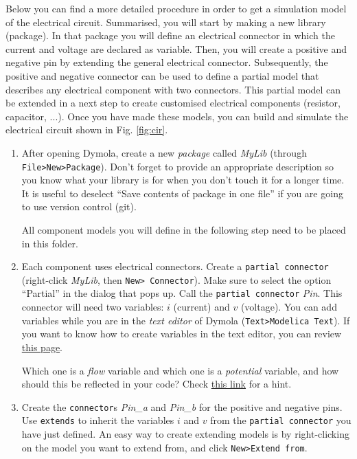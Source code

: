 \documentclass[10pt,a4paper]{article}
\begin{document}
Below you can find a more detailed procedure in order to get a simulation model of the electrical circuit. Summarised, you will start by making a new library (package). In that package you will define an electrical connector in which the current and voltage are declared as variable. Then, you will create a positive and negative pin by extending the general electrical connector. Subsequently, the positive and negative connector can be used to define a partial model that describes any electrical component with two connectors. This partial model can be extended in a next step to create customised electrical components (resistor, capacitor, ...). Once you have made these models, you can build and simulate the electrical circuit shown in Fig. \ref{fig:cir}.
\vspace{5 mm}

\begin{enumerate}
	\item After opening Dymola, create a new \textit{package} called \textit{MyLib} (through \texttt{File>New>Package}). Don't forget to provide an appropriate description so you know what your library is for when you don't touch it for a longer time. It is useful to deselect ``Save contents of package in one file'' if you are going to use version control (git).
	
	All component models you will define in the following step need to be placed in this folder.
	
	\item Each component uses electrical connectors. Create a \texttt{partial connector} (right-click \textit{MyLib}, then \texttt{New> Connector}). Make sure to select the option ``Partial'' in the dialog that pops up. Call the \texttt{partial connector} \textit{Pin}. This connector will need two variables: $i$ (current) and $v$ (voltage). You can add variables while you are in the \textit{text editor} of Dymola (\texttt{Text>Modelica Text}). If you want to know how to create variables in the text editor, you can review \href{https://mbe.modelica.university/behavior/equations/variables/#variables}{this page}. 

	Which one is a \textit{flow} variable and which one is a \textit{potential} variable, and how should this be reflected in your code? Check 
	\href{https://mbe.modelica.university/components/connectors/simple_domains/#simple-domains}{this link} for a hint.
	
	\item Create the \texttt{connector}s \textit{Pin\_a} and \textit{Pin\_b} for the positive and negative pins. Use \texttt{extends} to inherit the variables $i$ and $v$ from the \texttt{partial connector} you have just defined. An easy way to create extending models is by right-clicking on the model you want to extend from, and click \texttt{New>Extend from}.
	

\end{enumerate}
\end{document}
